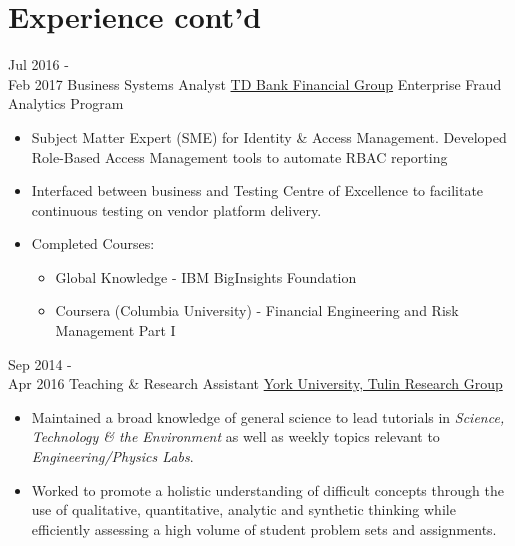 \documentclass[letterpaper]{twentysecondcv} %
\begin{document}
\vfill

\newpage
{}


\section{Experience cont'd}

\begin{twenty} %
    \twentyitem
   		{Jul 2016 - \\
   		Feb 2017}
        {Business Systems Analyst}
        {\href{http://www.td.com/}{TD Bank Financial Group}}
        {Enterprise Fraud Analytics Program}
        {
	        \item{}
    	    \item{}
        	\item{}
        	\item
        	\item
        	\item{}
        	\item{}
        }
        {
        {
        \begin{itemize}
	        \item Subject Matter Expert (SME) for Identity \& Access Management. Developed Role-Based Access Management tools to automate RBAC reporting
    	    \item Interfaced between business and Testing Centre of Excellence to facilitate continuous testing on vendor platform delivery.
        	\item Completed Courses: 
        	\begin{itemize}
        		\item Global Knowledge - IBM BigInsights Foundation
    	    	\item Coursera (Columbia University) - Financial Engineering and Risk Management Part I
	        \end{itemize}
	    \end{itemize}}
        }        

     \twentyitem
   		{Sep 2014 - \\ Apr 2016}
        {Teaching \& Research Assistant}
        {\href{http://www.yorku.ca/}{York University, Tulin Research Group}}
        {}
        {}
        {
        \begin{itemize}
        \item Maintained a broad knowledge of general science to lead tutorials in \emph{Science, Technology \& the Environment} as well as  weekly topics relevant to \emph{Engineering/Physics Labs}.
        \item Worked to promote a holistic understanding of difficult concepts through the use of qualitative, quantitative, analytic and synthetic thinking while efficiently assessing a high volume of student problem sets and assignments.
	    \end{itemize}
    	}



\end{twenty}
\end{document}
